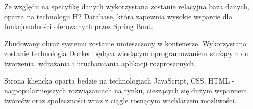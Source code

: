 \documentclass[a4paper,11pt]{article}
\begin{document}
    Ze względu na specyfikę danych wykorzystana zostanie relacyjna baza danych, oparta na technologii H2 Database, która zapewnia wysokie wsparcie dla funkcjonalności oferowanych przez Spring Boot.
    
    Zbudowany obraz systemu zostanie umieszczony w kontenerze. Wykorzystana zostanie technologia Docker będąca wiodącym oprogramowaniem służącym do tworzenia, wdrażania i uruchamiania aplikacji rozproszonych.
    
    Strona kliencka oparta będzie na technologiach JavaScript, CSS, HTML - najpopularniejszych rozwiązaniach na rynku, cieszących się dużym wsparciem twórców oraz społeczności wraz z ciągle rosnącym wachlarzem możliwości.
\end{document}
